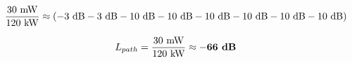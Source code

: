 $${30 \hbox{ mW} \over 120 \hbox{ kW}} \approx \left(-3 \hbox{ dB} - 3 \hbox{ dB} -10 \hbox{ dB} -10 \hbox{ dB} -10 \hbox{ dB} -10 \hbox{ dB} -10 \hbox{ dB} -10 \hbox{ dB} \right)$$

$$L_{path} = {30 \hbox{ mW} \over 120 \hbox{ kW}} \approx - \hbox{\bf 66 dB}$$











